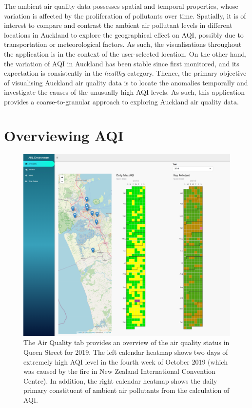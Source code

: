 \documentclass{aucklandthesis}
\begin{document}
The ambient air quality data possesses spatial and temporal properties, whose variation is affected by the proliferation of pollutants over time. Spatially, it is of interest to compare and contrast the ambient air pollutant levels in different locations in Auckland to explore the geographical effect on AQI, possibly due to transportation or meteorological factors. As such, the visualisations throughout the application is in the context of the user-selected location. On the other hand, the variation of AQI in Auckland has been stable since first monitored, and its expectation is consistently in the \emph{healthy} category. Thence, the primary objective of visualising Auckland air quality data is to locate the anomalies temporally and investigate the causes of the unusually high AQI levels. As such, this application provides a coarse-to-granular approach to exploring Auckland air quality data.

\hypertarget{overviewing-aqi}{%
\section{Overviewing AQI}\label{overviewing-aqi}}

\begin{figure}
\includegraphics[width=1\linewidth]{figures/aqi-tab} \caption{The Air Quality tab provides an overview of the air quality status in Queen Street for 2019. The left calendar heatmap shows two days of extremely high AQI level in the fourth week of October 2019 (which was caused by the fire in New Zealand International Convention Centre). In addition, the right calendar heatmap shows the daily primary constituent of ambient air pollutants from the calculation of AQI.}\label{fig:unnamed-chunk-2}
\end{figure}
\end{document}
